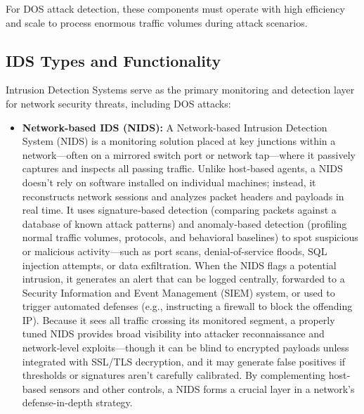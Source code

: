 \documentclass{report}
\begin{document}
For DOS attack detection, these components must operate with high efficiency and scale to process enormous traffic volumes during attack scenarios.

\subsection{IDS Types and Functionality}

Intrusion Detection Systems serve as the primary monitoring and detection layer for network security threats, including DOS attacks:

\begin{itemize}
\item \textbf{Network-based IDS (NIDS):}
A Network-based Intrusion Detection System (NIDS) is a monitoring solution placed at key junctions within a network—often on a mirrored switch port or network tap—where it passively captures and inspects all passing traffic. Unlike host‐based agents, a NIDS doesn't rely on software installed on individual machines; instead, it reconstructs network sessions and analyzes packet headers and payloads in real time. It uses signature‐based detection (comparing packets against a database of known attack patterns) and anomaly‐based detection (profiling normal traffic volumes, protocols, and behavioral baselines) to spot suspicious or malicious activity—such as port scans, denial-of-service floods, SQL injection attempts, or data exfiltration. When the NIDS flags a potential intrusion, it generates an alert that can be logged centrally, forwarded to a Security Information and Event Management (SIEM) system, or used to trigger automated defenses (e.g., instructing a firewall to block the offending IP). Because it sees all traffic crossing its monitored segment, a properly tuned NIDS provides broad visibility into attacker reconnaissance and network‐level exploits—though it can be blind to encrypted payloads unless integrated with SSL/TLS decryption, and it may generate false positives if thresholds or signatures aren't carefully calibrated. By complementing host‐based sensors and other controls, a NIDS forms a crucial layer in a network's defense-in-depth strategy.


\end{itemize}
\end{document}
